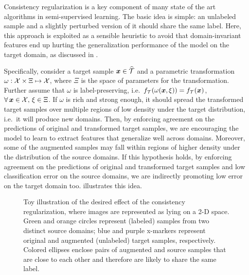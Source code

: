 Consistency regularization is a key component of many state of the art algorithms in semi-supervised learning. The basic idea is simple: an unlabeled sample and a slightly perturbed version of it should share the same label. Here, this approach is exploited as a sensible heuristic to avoid that domain-invariant features end up hurting the generalization performance of the model on the target domain, as discussed in .

Specifically, consider a target sample ${\bm{x}} \in \widehat{{\mathcal{T}}}$ and a parametric transformation $\omega: {\mathcal{X}} \times \Xi \mapsto {\mathcal{X}}$, where $\Xi$ is the space of parameters for the transformation. Further assume that $\omega$ is label-preserving, i.e.\ $f_{\mathcal{T}}(\omega({\bm{x}}, \xi)) = f_{\mathcal{T}}({\bm{x}})$, $\forall\, {\bm{x}} \in {\mathcal{X}}, \, \xi \in \Xi$. If $\omega$ is rich and strong enough, it should spread the transformed target samples over multiple regions of low density under the target distribution, i.e.\ it will produce new domains. Then, by enforcing agreement on the predictions of original and transformed target samples, we are encouraging the model to learn to extract features that generalize well across domains. Moreover, some of the augmented samples may fall within regions of higher density under the distribution of the source domains. If this hypothesis holds, by enforcing agreement on the predictions of original and transformed target samples and low classification error on the source domains, we are indirectly promoting low error on the target domain too.  illustrates this idea.

\begin{figure}[h]
	\centering
	\caption{Toy illustration of the desired effect of the consistency regularization, where images are represented as lying on a 2-D space. Green and orange circles represent (labeled) samples from two distinct source domains; blue and purple x-markers represent original and augmented (unlabeled) target samples, respectively. Colored ellipses enclose pairs of augmented and source samples that are close to each other and therefore are likely to share the same label.}
	\label{fig:consistency}
\end{figure}

